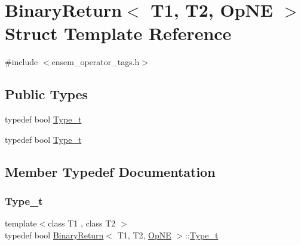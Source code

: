 \hypertarget{structBinaryReturn_3_01T1_00_01T2_00_01OpNE_01_4}{}\section{Binary\+Return$<$ T1, T2, Op\+NE $>$ Struct Template Reference}
\label{structBinaryReturn_3_01T1_00_01T2_00_01OpNE_01_4}


{\ttfamily \#include $<$ensem\+\_\+operator\+\_\+tags.\+h$>$}

\subsection*{Public Types}
\begin{DoxyCompactItemize}
\item 
typedef bool \mbox{\hyperlink{structBinaryReturn_3_01T1_00_01T2_00_01OpNE_01_4_af07b822218544651a5f4470391645f55}{Type\+\_\+t}}
\item 
typedef bool \mbox{\hyperlink{structBinaryReturn_3_01T1_00_01T2_00_01OpNE_01_4_af07b822218544651a5f4470391645f55}{Type\+\_\+t}}
\end{DoxyCompactItemize}


\subsection{Member Typedef Documentation}
\mbox{\label{structBinaryReturn_3_01T1_00_01T2_00_01OpNE_01_4_af07b822218544651a5f4470391645f55}} 
\subsubsection{\texorpdfstring{Type\_t}{Type\_t}\hspace{0.1cm}{\footnotesize\ttfamily [1/2]}}
{\footnotesize\ttfamily template$<$class T1 , class T2 $>$ \\
typedef bool \mbox{\hyperlink{structBinaryReturn}{Binary\+Return}}$<$ T1, T2, \mbox{\hyperlink{structOpNE}{Op\+NE}} $>$\+::\mbox{\hyperlink{structBinaryReturn_3_01T1_00_01T2_00_01OpNE_01_4_af07b822218544651a5f4470391645f55}{Type\+\_\+t}}}

\mbox{\label{structBinaryReturn_3_01T1_00_01T2_00_01OpNE_01_4_af07b822218544651a5f4470391645f55}} 
